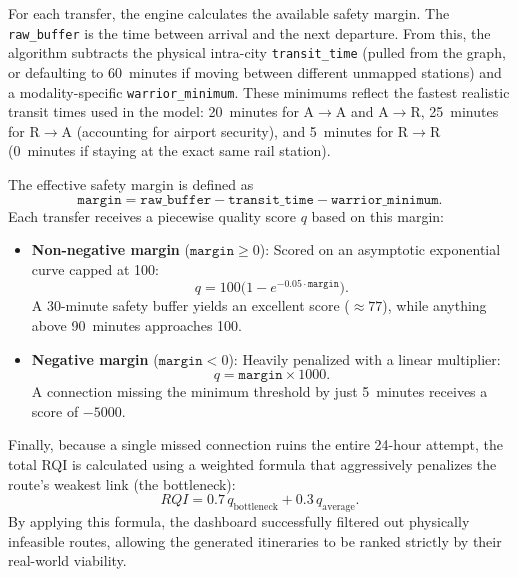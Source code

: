 \medskip

For each transfer, the engine calculates the available safety margin. The \texttt{raw\_buffer} is the time between arrival and the next departure. From this, the algorithm subtracts the physical intra-city \texttt{transit\_time} (pulled from the graph, or defaulting to 60~minutes if moving between different unmapped stations) and a modality-specific \texttt{warrior\_minimum}. These minimums reflect the fastest realistic transit times used in the model: 20~minutes for A$\to$A and A$\to$R, 25~minutes for R$\to$A (accounting for airport security), and 5~minutes for R$\to$R (0~minutes if staying at the exact same rail station).

The effective safety margin is defined as
\begin{equation}
\texttt{margin} = \texttt{raw\_buffer} - \texttt{transit\_time} - \texttt{warrior\_minimum}.
\end{equation}
Each transfer receives a piecewise quality score $q$ based on this margin:
\begin{itemize}
    \item \textbf{Non-negative margin} ($\texttt{margin} \geq 0$): Scored on an asymptotic exponential curve capped at 100:
    \begin{equation}
    q = 100 \bigl(1 - e^{-0.05 \cdot \texttt{margin}}\bigr).
    \end{equation}
    A 30-minute safety buffer yields an excellent score ($\approx 77$), while anything above 90~minutes approaches 100.
    \item \textbf{Negative margin} ($\texttt{margin} < 0$): Heavily penalized with a linear multiplier:
    \begin{equation}
    q = \texttt{margin} \times 1000.
    \end{equation}
    A connection missing the minimum threshold by just 5~minutes receives a score of $-5000$.
\end{itemize}

Finally, because a single missed connection ruins the entire 24-hour attempt, the total RQI is calculated using a weighted formula that aggressively penalizes the route's weakest link (the bottleneck):
\begin{equation}
RQI = 0.7\, q_{\text{bottleneck}} + 0.3\, q_{\text{average}}.
\end{equation}
By applying this formula, the dashboard successfully filtered out physically infeasible routes, allowing the generated itineraries to be ranked strictly by their real-world viability.

